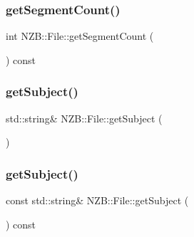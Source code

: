 \hypertarget{class_n_z_b_1_1_file_a2aab94f806e5cc265413e3ad4d7e5ec2}{}\label{class_n_z_b_1_1_file_a2aab94f806e5cc265413e3ad4d7e5ec2} 
\subsubsection{\texorpdfstring{get\+Segment\+Count()}{getSegmentCount()}}
{\footnotesize\ttfamily int N\+Z\+B\+::\+File\+::get\+Segment\+Count (\begin{DoxyParamCaption}{ }\end{DoxyParamCaption}) const\hspace{0.3cm}{\ttfamily [inline]}}

\hypertarget{class_n_z_b_1_1_file_a1110d411e6e7fd3ecb9b7f74e476924b}{}\label{class_n_z_b_1_1_file_a1110d411e6e7fd3ecb9b7f74e476924b} 
\subsubsection{\texorpdfstring{get\+Subject()}{getSubject()}\hspace{0.1cm}{\footnotesize\ttfamily [1/2]}}
{\footnotesize\ttfamily std\+::string\& N\+Z\+B\+::\+File\+::get\+Subject (\begin{DoxyParamCaption}{ }\end{DoxyParamCaption})\hspace{0.3cm}{\ttfamily [inline]}}

\hypertarget{class_n_z_b_1_1_file_aa14b0404ce708a3cd15c7aa6803704ee}{}\label{class_n_z_b_1_1_file_aa14b0404ce708a3cd15c7aa6803704ee} 
\subsubsection{\texorpdfstring{get\+Subject()}{getSubject()}\hspace{0.1cm}{\footnotesize\ttfamily [2/2]}}
{\footnotesize\ttfamily const std\+::string\& N\+Z\+B\+::\+File\+::get\+Subject (\begin{DoxyParamCaption}{ }\end{DoxyParamCaption}) const\hspace{0.3cm}{\ttfamily [inline]}}

